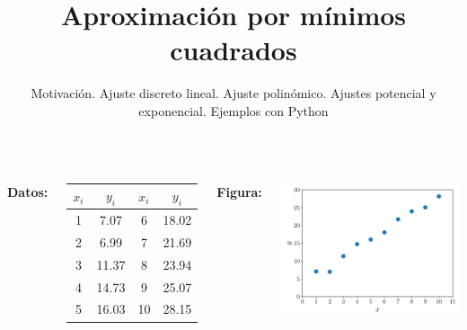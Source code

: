 \documentclass[9pt, aspectratio=169]{beamer}
\title{Aproximación por mínimos cuadrados}
\subtitle{Motivación. Ajuste discreto lineal. Ajuste polinómico. Ajustes potencial y exponencial. Ejemplos con Python}
\begin{document}
\maketitle

\begin{frame}
\begin{columns}[t]
\textbf{Datos:}

\begin{center}
\begin{tabular}{cccc}
\toprule
$x_i$ & $y_i$ & $x_i$ & $y_i$ \\
\midrule
 1 & 7.07 &  6 & 18.02 \\
 2 & 6.99 &  7 & 21.69 \\
 3 & 11.37 &  8 & 23.94 \\
 4 & 14.73 &  9 & 25.07 \\
 5 & 16.03 & 10 & 28.15 \\
\bottomrule
\end{tabular}
\end{center}

\textbf{Figura:}
\begin{center}
    \includegraphics[scale=0.40]{figs/fig-01.pdf}
\end{center}
\end{columns}
\end{frame}
\end{document}
